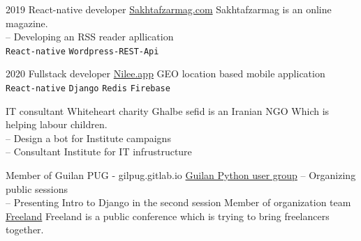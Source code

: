 \documentclass[9pt]{developercv}
\begin{document}
\begin{entrylist}
	\entry
	{2019}
	{React-native developer}
	{{\href{https://www.sakhtafzarmag.com/}{Sakhtafzarmag.com}}}
	{
		Sakhtafzarmag is an online magazine. \\
		-- Developing an RSS reader apllication \\
		\texttt{React-native}\slashsep
		\texttt{Wordpress-REST-Api}\slashsep
	}
\end{entrylist}
\begin{entrylist}
	\entry
	{2020}
	{Fullstack developer}
	{{\href{https://www.nilee.app/}{Nilee.app}}}
	{
		GEO location based mobile application \\
		\texttt{React-native}\slashsep
		\texttt{Django}\slashsep
		\texttt{Redis}\slashsep
		\texttt{Firebase}\\
	}
\end{entrylist}





\begin{entrylist}
	\entrytwocol
	{IT consultant}
	{Whiteheart charity}
	{Ghalbe sefid is an Iranian NGO Which is helping labour children. \\
		-- Design a bot for Institute campaigns \\
		-- Consultant Institute for IT infrustructure}

	\entrytwocol
	{Member of Guilan PUG - gilpug.gitlab.io}
	{
		{{\href{https://www.instagram.com/p/B89LgJhlW_N/}{Guilan Python user group}}}
	}
	{
		-- Organizing public sessions \\
		-- Presenting Intro to Django in the second session
	}
	\entrytwocol
	{Member of organization team}
	{{{\href{https://freelanday.ir/}{Freeland}}}}
	{Freeland is a public conference which is trying to bring freelancers together.}
\end{entrylist}


\end{document}
